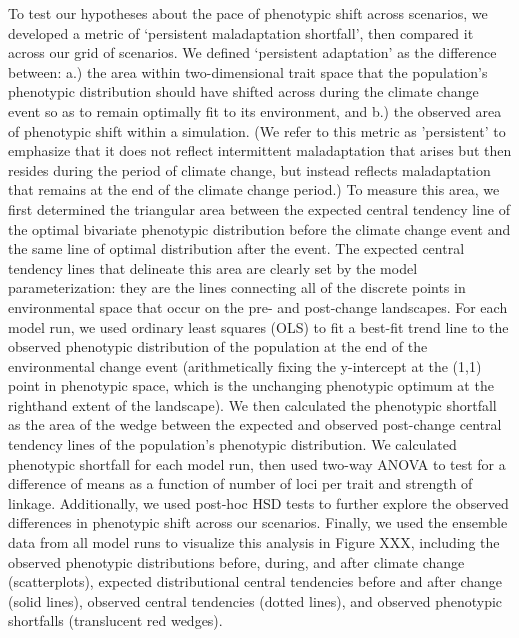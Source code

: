 \documentclass[9pt,twocolumn,twoside,lineno]{pnas-new}
\begin{document}
{To test our hypotheses about the pace of phenotypic shift across scenarios, we 
developed a metric of ‘persistent maladaptation shortfall’, then compared it across our grid of 
scenarios. We defined ‘persistent adaptation’ as the difference between: a.) the area 
within two-dimensional trait space that the population’s phenotypic distribution 
should have shifted across during the climate change event so as to remain 
optimally fit to its environment, and b.) the observed area of phenotypic shift within
a simulation. (We refer to this metric as 'persistent' to emphasize that it does
not reflect intermittent maladaptation that arises but then resides during the period of climate
change, but instead reflects maladaptation that remains at the end of the
climate change period.) To measure this area, we first determined the triangular area between 
the expected central tendency line of the optimal bivariate phenotypic distribution 
before the climate change event and the same line of optimal distribution after 
the event. The expected central tendency lines that delineate this area are clearly 
set by the model parameterization: they are the lines connecting all of the discrete 
points in environmental space that occur on the pre- and post-change landscapes. For 
each model run, we used ordinary least squares (OLS) to fit a best-fit trend line to 
the observed phenotypic distribution of the population at the end of the environmental
change event (arithmetically fixing the y-intercept at the (1,1) point in phenotypic 
space, which is the unchanging phenotypic optimum at the righthand extent of the 
landscape). We then calculated the phenotypic shortfall as the area of the wedge 
between the expected and observed post-change central tendency lines of the 
population’s phenotypic distribution. We calculated phenotypic shortfall for each 
model run, then used two-way ANOVA to test for a difference of means as a function of 
number of loci per trait and strength of linkage. Additionally, we used post-hoc HSD 
tests to further explore the observed differences in phenotypic shift across our 
scenarios. Finally, we used the ensemble data from all model runs to visualize this 
analysis in Figure XXX, including the observed phenotypic distributions before, 
during, and after climate change (scatterplots), expected distributional central
tendencies before and after change (solid lines), observed central tendencies (dotted 
lines), and observed phenotypic shortfalls (translucent red wedges).
	

}
\end{document}
